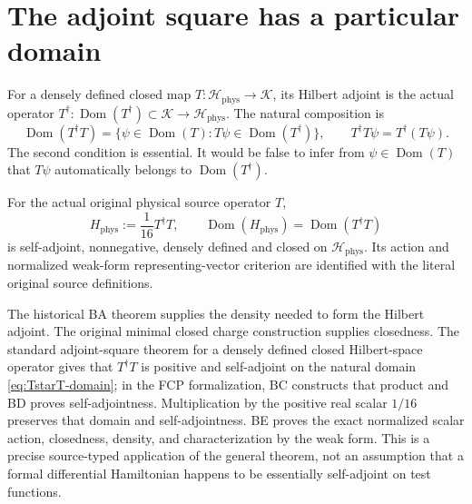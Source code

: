\section{The adjoint square has a particular domain}
For a densely defined closed map $T:\mathscr H_{\mathrm{phys}}\to\mathscr K$,
its Hilbert adjoint is the actual operator
$T^\dagger:\operatorname{Dom}(T^\dagger)\subset\mathscr K
\to\mathscr H_{\mathrm{phys}}$. The natural composition is
\begin{equation}\label{eq:TstarT-domain}
 \operatorname{Dom}(T^\dagger T)
 =\{\psi\in\operatorname{Dom}(T):
 T\psi\in\operatorname{Dom}(T^\dagger)\},\qquad
 T^\dagger T\psi=T^\dagger(T\psi).
\end{equation}
The second condition is essential. It would be false to infer from
$\psi\in\operatorname{Dom}(T)$ that $T\psi$ automatically belongs to
$\operatorname{Dom}(T^\dagger)$.

\begin{sourceaccount}\label{thm:source-H}
For the actual original physical source operator $T$,
\begin{equation}\label{eq:source-H}
 H_{\mathrm{phys}}:=\frac1{16}T^\dagger T,
 \qquad
 \operatorname{Dom}(H_{\mathrm{phys}})=
 \operatorname{Dom}(T^\dagger T)
\end{equation}
is self-adjoint, nonnegative, densely defined and closed on
$\mathscr H_{\mathrm{phys}}$. Its action and normalized weak-form
representing-vector criterion are identified with the literal original
source definitions.
\end{sourceaccount}
\begin{sourceexplanation}
The historical BA theorem supplies the density needed to form the
Hilbert adjoint. The original minimal closed charge construction supplies
closedness. The standard adjoint-square theorem for a densely defined
closed Hilbert-space operator gives that $T^\dagger T$ is positive and
self-adjoint on the natural domain \eqref{eq:TstarT-domain}; in the FCP
formalization, BC constructs that product and BD proves self-adjointness.
Multiplication by the positive real scalar $1/16$ preserves that domain
and self-adjointness. BE proves the exact normalized scalar action,
closedness, density, and characterization by the weak form. This is a
precise source-typed application of the general theorem, not an
assumption that a formal differential Hamiltonian happens to be
essentially self-adjoint on test functions.
\end{sourceexplanation}

